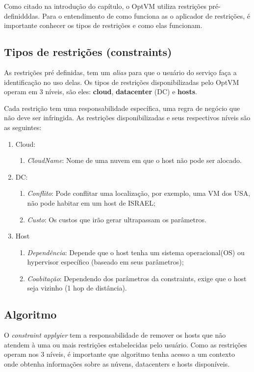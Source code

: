 Como citado na introdução do capítulo, o OptVM utiliza restrições pré-definidddas.
Para o entendimento de como funciona as o aplicador de restrições, é importante conhecer os tipos de 
restrições e como elas funcionam.

\subsection{Tipos de restrições (constraints)}

As restrições pré definidas, tem um \textit{alias} para que o usuário do serviço faça a identificação no uso delas.
Os tipos de restrições disponibilizadas pelo OptVM operam em 3 níveis, são eles: \textbf{cloud}, \textbf{datacenter} (DC)
e \textbf{hosts}.

Cada restrição tem uma responsabilidade específica, uma regra de negócio que não deve ser infringida. 
As restrições disponibilizadas e seus respectivos níveis são as seguintes:

\begin{enumerate}
  \item Cloud:
  \begin{enumerate}
    \item \textit{CloudName}: Nome de uma nuvem em que o host não pode ser alocado.
  \end{enumerate}

  \item DC:
  \begin{enumerate}
    \item \textit{Conflito}: Pode conflitar uma localização, por exemplo, uma VM dos USA, não pode habitar em um host de ISRAEL;
    \item \textit{Custo}: Os custos que irão gerar ultrapassam os parâmetros.
  \end{enumerate}

 \item Host
  \begin{enumerate}
    \item \textit{Dependência}: Depende que o host tenha um sistema operacional(OS) ou hypervisor específico (baseado em seus parâmetros);
    \item \textit{Coabitação}: Dependendo dos parâmetros da constraints, exige que o host seja vizinho (1 hop de distância).
  \end{enumerate}
  
\end{enumerate}

\subsection{Algoritmo}
O \textit{constraint applyier} tem a responsabilidade de remover os hosts que não atendem à
uma ou mais restrições estabelecidas pelo usuário. Como as restrições operam nos 3 níveis,
é importante que algoritmo tenha acesso a um contexto onde obtenha informações sobre as núvens, 
datacenters e hosts disponíveis.

